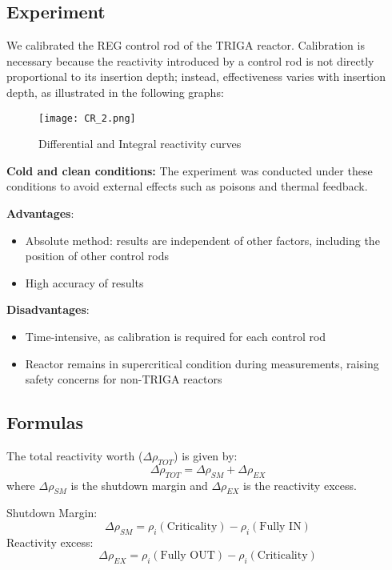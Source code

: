 \subsection{Experiment}
We calibrated the REG control rod of the TRIGA reactor. Calibration is necessary because the reactivity introduced by a control rod is not directly proportional to its insertion depth; instead, effectiveness varies with insertion depth, as illustrated in the following graphs:

\begin{figure}[h]
    \centering
    \texttt{[image: CR\_2.png]}
    \caption{Differential and Integral reactivity curves}
\end{figure}

\textbf{Cold and clean conditions:} The experiment was conducted under these conditions to avoid external effects such as poisons and thermal feedback.

\begin{tcolorbox}[boxstyle2, title=PRO vs CONS]
    \textbf{Advantages}:
    \begin{itemize}
        \item Absolute method: results are independent of other factors, including the position of other control rods
        \item High accuracy of results 
    \end{itemize}
    \textbf{Disadvantages}: 
    \begin{itemize}
        \item Time-intensive, as calibration is required for each control rod
        \item Reactor remains in supercritical condition during measurements, raising safety concerns for non-TRIGA reactors
    \end{itemize}
\end{tcolorbox}

\subsection{Formulas}
The total reactivity worth ($\Delta \rho _{TOT}$) is given by:
\begin{equation}
    \Delta \rho _{TOT} = \Delta \rho _{SM} + \Delta \rho _{EX}
\end{equation}
where $\Delta \rho _{SM}$ is the shutdown margin and $\Delta \rho _{EX}$ is the reactivity excess.

Shutdown Margin:
\begin{equation}
    \Delta \rho _{SM} = \rho_i (\text{Criticality}) - \rho_i (\text{Fully IN}) 
\end{equation}
Reactivity excess:
\begin{equation}
    \Delta \rho _{EX} = \rho_i (\text{Fully OUT}) - \rho_i (\text{Criticality})
\end{equation}

